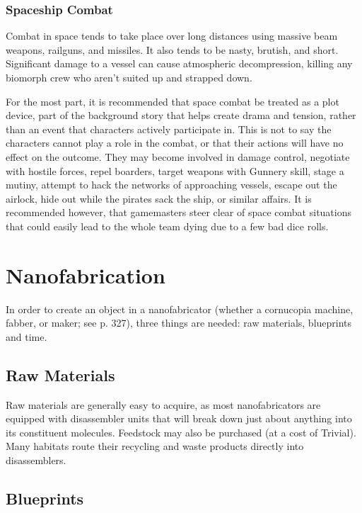 \subsubsection{Spaceship Combat}

Combat in space tends to take place over long distances
using massive beam weapons, railguns, and
missiles. It also tends to be nasty, brutish, and short. 
Significant damage to a vessel can cause atmospheric 
decompression, killing any biomorph crew who aren't 
suited up and strapped down. 

For the most part, it is recommended that space 
combat be treated as a plot device, part of the background
story that helps create drama and tension,
rather than an event that characters actively participate
in. This is not to say the characters cannot play a
role in the combat, or that their actions will have no 
effect on the outcome. They may become involved in 
damage control, negotiate with hostile forces, repel 
boarders, target weapons with Gunnery skill, stage a 
mutiny, attempt to hack the networks of approaching
vessels, escape out the airlock, hide out while the
pirates sack the ship, or similar affairs. It is recommended
however, that gamemasters steer clear of
space combat situations that could easily lead to the 
whole team dying due to a few bad dice rolls.

\section{Nanofabrication}

In order to create an object in a nanofabricator 
(whether a cornucopia machine, fabber, or maker; see 
p. 327), three things are needed: raw materials, blueprints
and time.

\subsection{Raw Materials}

Raw materials are generally easy to acquire, as most 
nanofabricators are equipped with disassembler units 
that will break down just about anything into its constituent
molecules. Feedstock may also be purchased
(at a cost of Trivial). Many habitats route their recycling
and waste products directly into disassemblers.

\subsection{Blueprints}

